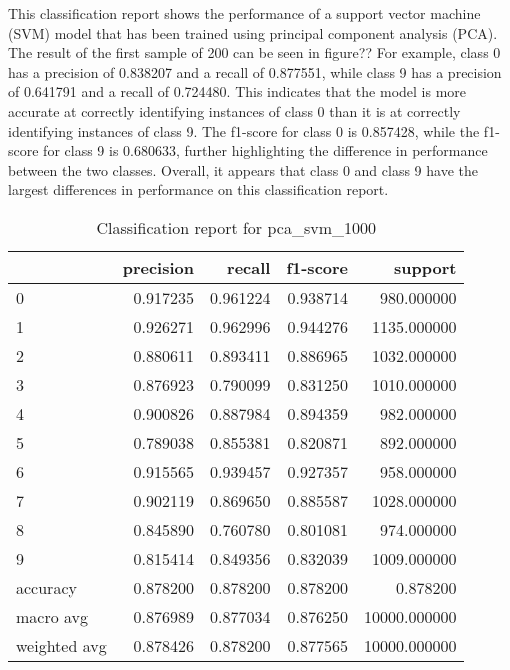 This classification report shows the performance of a support vector machine (SVM) model that has been trained using principal component analysis (PCA). The result of the first sample of 200 can be seen in figure??
For example, class 0 has a precision of 0.838207 and a recall of 0.877551, while class 9 has a precision of 0.641791 and a recall of 0.724480. This indicates that the model is more accurate at correctly identifying instances of class 0 than it is at correctly identifying instances of class 9. The f1-score for class 0 is 0.857428, while the f1-score for class 9 is 0.680633, further highlighting the difference in performance between the two classes. Overall, it appears that class 0 and class 9 have the largest differences in performance on this classification report.


\begin{table}[htb!]
    \centering
    \caption{Classification report for pca_svm_1000}
    \label{tab:classification-report-pca_svm_1000}
    \begin{tabular}{lrrrr}
    \toprule
     & precision & recall & f1-score & support \\
    \midrule
    0 & 0.917235 & 0.961224 & 0.938714 & 980.000000 \\
    1 & 0.926271 & 0.962996 & 0.944276 & 1135.000000 \\
    2 & 0.880611 & 0.893411 & 0.886965 & 1032.000000 \\
    3 & 0.876923 & 0.790099 & 0.831250 & 1010.000000 \\
    4 & 0.900826 & 0.887984 & 0.894359 & 982.000000 \\
    5 & 0.789038 & 0.855381 & 0.820871 & 892.000000 \\
    6 & 0.915565 & 0.939457 & 0.927357 & 958.000000 \\
    7 & 0.902119 & 0.869650 & 0.885587 & 1028.000000 \\
    8 & 0.845890 & 0.760780 & 0.801081 & 974.000000 \\
    9 & 0.815414 & 0.849356 & 0.832039 & 1009.000000 \\
    accuracy & 0.878200 & 0.878200 & 0.878200 & 0.878200 \\
    macro avg & 0.876989 & 0.877034 & 0.876250 & 10000.000000 \\
    weighted avg & 0.878426 & 0.878200 & 0.877565 & 10000.000000 \\
    \bottomrule
    \end{tabular}
    \end{table}

